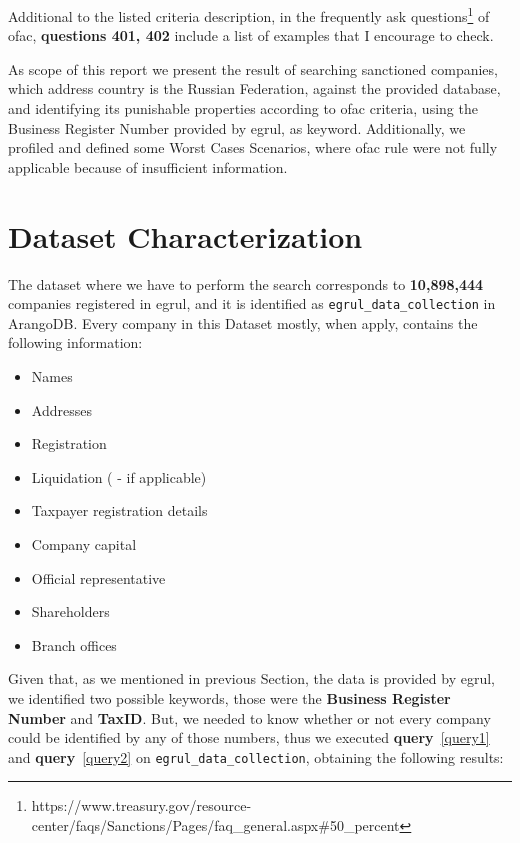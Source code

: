 \begin{spacing}{1.5}
	Additional to the listed criteria description, in the frequently ask questions\footnote{https://www.treasury.gov/resource-center/faqs/Sanctions/Pages/faq\_general.aspx\#50\_percent} of \gls{ofac}, \textbf{questions 401, 402} include a list of examples that I encourage to check.   
	
	As scope of this report we present the result of searching sanctioned companies, which address country is the Russian Federation, against the provided database, and identifying its punishable properties according to \gls{ofac} criteria, using the Business Register Number provided by \gls{egrul}, as keyword.  Additionally, we profiled and defined some Worst Cases Scenarios, where \gls{ofac} rule were not fully applicable because of insufficient information.  
	

\section{Dataset Characterization}\label{dataset}

	The dataset where we have to perform the search corresponds to \textbf{10,898,444} companies registered in \gls{egrul}, and it is identified as \texttt{egrul\_data\_collection} in ArangoDB. Every company in this Dataset mostly, when apply, contains the following information:
	
	\begin{itemize}
		 
		\item Names
		\item Addresses 
		\item Registration 
		\item Liquidation ( - if applicable)
		\item Taxpayer registration details 
		\item Company capital
		\item Official representative 
		\item Shareholders
		\item Branch offices 
	\end{itemize}

Given that, as we mentioned in previous Section, the data is provided by \gls{egrul}, we identified two possible keywords, those were the \textbf{Business Register Number} and \textbf{TaxID}. But, we needed to know whether or not every company could be identified by any of those numbers, thus we executed \textbf{query}~\ref{query1} and \textbf{query}~\ref{query2} on \texttt{egrul\_data\_collection}, obtaining the following results:
	

\end{spacing}
